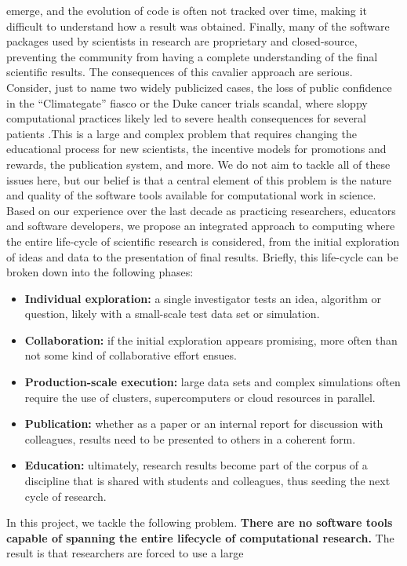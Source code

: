 \documentclass[letterpaper,10pt,english]{/Users/bgranger/Library/Python/2.7/lib/python/site-packages/sphinx/texinputs/sphinxhowto}
\begin{document}
emerge, and the evolution of code is often not tracked over time, making
it difficult to understand how a result was obtained. Finally, many of
the software packages used by scientists in research are proprietary and
closed-source, preventing the community from having a complete
understanding of the final scientific results. The consequences of this
cavalier approach are serious. Consider, just to name two widely
publicized cases, the loss of public confidence in the ``Climategate''
fiasco \cite{Hef10} or the Duke cancer trials scandal, where sloppy
computational practices likely led to severe health consequences for
several patients \cite{Cou10}.This is a large and complex problem that requires changing the
educational process for new scientists, the incentive models for
promotions and rewards, the publication system, and more. We do not aim
to tackle all of these issues here, but our belief is that a central
element of this problem is the nature and quality of the software tools
available for computational work in science. Based on our experience
over the last decade as practicing researchers, educators and software
developers, we propose an integrated approach to computing where the
entire life-cycle of scientific research is considered, from the initial
exploration of ideas and data to the presentation of final results.
Briefly, this life-cycle can be broken down into the following phases:\begin{itemize}
\itemsep1pt\parskip0pt
\item
  \textbf{Individual exploration:} a single investigator tests an idea,
  algorithm or question, likely with a small-scale test data set or
  simulation.
\item
  \textbf{Collaboration:} if the initial exploration appears promising,
  more often than not some kind of collaborative effort ensues.
\item
  \textbf{Production-scale execution:} large data sets and complex
  simulations often require the use of clusters, supercomputers or cloud
  resources in parallel.
\item
  \textbf{Publication:} whether as a paper or an internal report for
  discussion with colleagues, results need to be presented to others in
  a coherent form.
\item
  \textbf{Education:} ultimately, research results become part of the
  corpus of a discipline that is shared with students and colleagues,
  thus seeding the next cycle of research.
\end{itemize}In this project, we tackle the following problem. \textbf{There are no
software tools capable of spanning the entire lifecycle of computational
research.} The result is that researchers are forced to use a large
\end{document}

